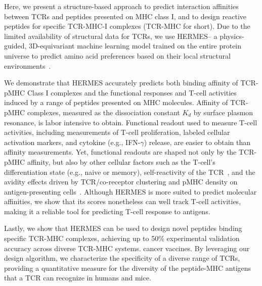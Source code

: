 Here, we present a structure-based approach to predict interaction affinities between TCRs and
peptides presented on {MHC class I}, and to design reactive peptides for specific TCR-MHC-I
complexes (TCR-MHC for short). Due to the limited availability of structural data for TCRs, we use
HERMES-- a physics-guided, 3D-equivariant machine learning model trained on the entire protein
universe to predict amino acid preferences based on their local structural
environments~\cite{Pun2024-qz,Visani2024-sh}.
 
{We demonstrate that HERMES accurately predicts both binding affinity of TCR-pMHC Class I complexes
and the functional responses and T-cell activities induced by a range of peptides presented on MHC
molecules. Affinity of TCR-pMHC complexes, measured as the dissociation constant $K_d$ by surface
plasmon resonance, is labor intensive to obtain. Functional readout used to measure T-cell
activities, including measurements of T-cell proliferation, labeled cellular activation markers, and
cytokine (e.g., IFN-$\gamma$) release, are easier to obtain than affinity measurements. Yet,
functional readouts are shaped not only by the TCR-pMHC affinity, but also by other cellular factors
such as the T-cell's differentiation state (e.g., naive or memory), self-reactivity of the
TCR~\cite{Altan-Bonnet2005-lm,Achar2022-tb}, and the avidity effects driven by TCR/co-receptor
clustering and pMHC density on antigen-presenting cells~\cite{Stone2009-ab}. Although HERMES is more
suited to predict molecular affinities, we show that its scores nonetheless can well track T-cell
activities, making it a reliable tool for predicting T-cell response to antigens.}

Lastly, we show that HERMES can be used to design novel peptides {binding specific} TCR-MHC
complexes, achieving up to 50\% experimental validation accuracy across diverse TCR-MHC systems.
cancer vaccines.
By leveraging our design algorithm, we characterize the specificity of a diverse range of {TCRs},
providing a quantitative measure for the diversity of the peptide-MHC antigens that a TCR can
recognize in humans and mice.

